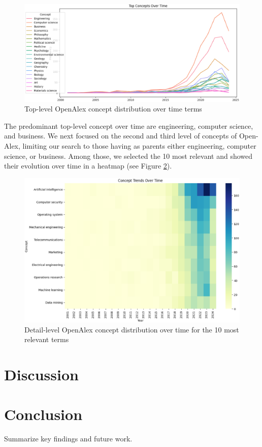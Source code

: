 \documentclass[a4paper, review, endfloat, authoryear]{elsarticle}
\begin{document}
	\begin{figure}[htbp]
		\centering
		\includegraphics[width=\linewidth]{pics/main_concept_trend_toplevel.eps}
		\caption{Top-level OpenAlex concept distribution over time terms}\label{fig:fig13}
	\end{figure}
	
	The predominant top-level concept over time are engineering, computer science, and business. We next focused on the second and third level of concepts of Open-Alex, limiting our search to those having as parents either engineering, computer science, or business. Among those, we selected the 10 most relevant and showed their evolution over time in a heatmap (see Figure \ref{fig:fig14}).
	
	\begin{figure}[htbp]
		\centering
		\includegraphics[width=\linewidth]{pics/main_concept_trend_lowerlevels.eps}
		\caption{Detail-level OpenAlex concept distribution over time for the 10 most relevant terms}\label{fig:fig14}
	\end{figure}
	
	\section{Discussion}
	
	\section{Conclusion}
	Summarize key findings and future work.
	
	
	
	
\end{document}
